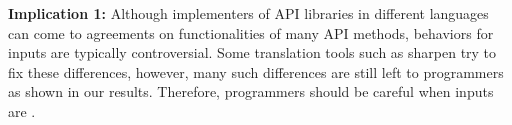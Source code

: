 
\textbf{Implication 1:} Although implementers of API libraries in different languages can come to agreements on functionalities of many API methods, behaviors for  inputs are typically controversial. Some translation tools such as sharpen try to fix these differences, however, many such differences are still left to programmers as shown in our results. Therefore, programmers should be careful when inputs are .

